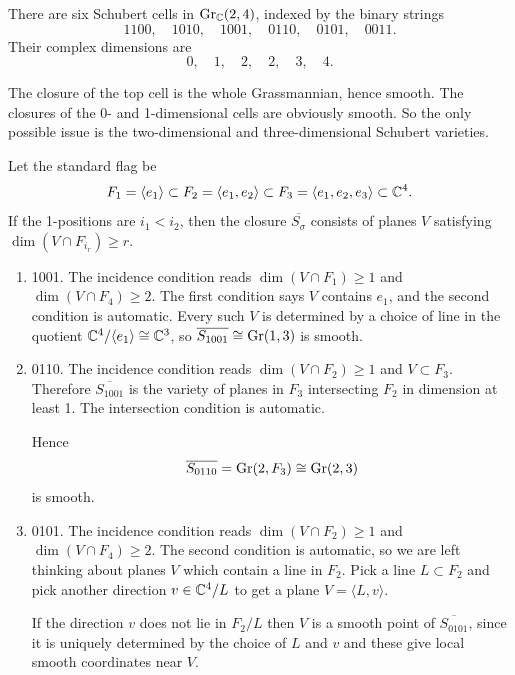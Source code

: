 \documentclass[12pt]{article}  %
\begin{document}
\begin{solution}
There are six Schubert cells in $\operatorname{Gr}_{\mathbb{C}}(2,4)$, indexed by the binary strings
\[
1100,\quad 1010,\quad 1001,\quad 0110,\quad 0101,\quad 0011.
\]
Their complex dimensions are
\[
0,\quad 1,\quad 2,\quad 2,\quad 3,\quad 4.
\]

The closure of the top cell is the whole Grassmannian, hence smooth.
The closures of the 0- and 1-dimensional cells are obviously smooth.
So the only possible issue is the two-dimensional and three-dimensional Schubert varieties.


Let the standard flag be
\[
F_1=\langle e_1\rangle \subset
F_2=\langle e_1,e_2\rangle \subset
F_3=\langle e_1,e_2,e_3\rangle \subset
\mathbb{C}^4 .
\]
If the 1-positions are $i_1<i_2$, then the closure $\overline{S_\sigma}$ consists of planes $V$ satisfying $\dim(V\cap F_{i_r}) \ge r$.
\begin{enumerate}
    \item 1001. The incidence condition reads $\dim(V\cap F_1)\ge 1$ and $\dim(V\cap F_4)\ge 2$. The first condition says $V$ contains $e_1$, and the second condition is automatic. Every such $V$ is determined by a choice of line in the quotient $\mathbb{C}^4/\langle e_1\rangle\cong \mathbb{C}^3$, so $\overline{S_{1001}}\cong \operatorname{Gr}(1,3)$ is smooth.


\item 0110. The incidence condition reads $\dim(V\cap F_2)\ge 1$ and
$V\subset F_3$. Therefore $\overline{S_{1001}}$ is the variety of planes in $F_3$ intersecting $F_2$ in dimension at least 1. The intersection condition is automatic.

Hence
\[
\overline{S_{0110}}=\operatorname{Gr}(2,F_3)\cong \operatorname{Gr}(2,3)
\] is smooth.

\item 0101. The incidence condition reads $\dim(V\cap F_2)\ge 1$ and $\dim(V\cap F_4)\ge 2$. The second condition is automatic, so we are left thinking about planes $V$ which contain a line in $F_2$. Pick a line $L\subset F_2$ and pick another direction $v \in \mathbb{C}^4/L$ to get a plane $V=\langle L,v\rangle$. 

If the direction $v$ does not lie in $F_2/L$ then $V$ is a smooth point of $\overline{S_{0101}}$, since it is uniquely determined by the choice of $L$ and $v$ and these give local smooth coordinates near $V$. 



\end{enumerate}
\end{solution}
\end{document}
